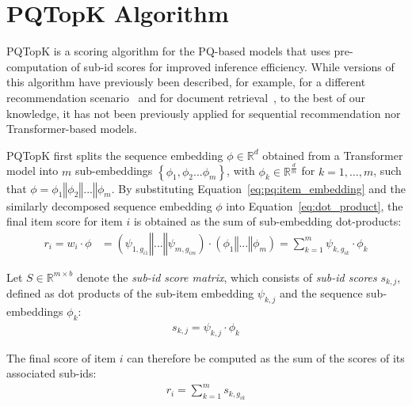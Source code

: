 \documentclass[sigconf,natbib=true, review=true]{acmart} %
\newcommand{\pageenlarge}[1]{\marginnote{#1}\enlargethispage{#1\baselineskip}}
\newcommand{\rsasha}[1]{\textcolor[HTML]{FF0000}{#1}}
\begin{document}
\pageenlarge{3}
\section{PQTopK Algorithm} \label{sec:pq_topk}
\rsasha{PQTopK is a scoring algorithm for the PQ-based models \rsasha{that uses pre-computation of sub-id scores for improved inference efficiency}. While versions of this algorithm have previously been described, for example, for a different recommendation scenario~\cite{lianLightRecMemorySearchEfficient2020} and for document retrieval~\cite{zhanJointlyOptimizingQuery2021}, to the best of our knowledge, it has not been previously applied for sequential recommendation nor Transformer-based models.}

 PQTopK first splits the sequence embedding $\phi \in \mathbb{R}^{d}$ \rsasha{obtained from a Transformer model} into $m$ sub-embeddings $\left\{\phi_1, \phi_2 ... \phi_m\right\}$, with $\phi_{k} \in \mathbb{R}^{\frac{d}{m}}$ for $k=1, \ldots,m$, such that $\phi = \phi_1  \mathbin\Vert \phi_2  \mathbin\Vert ... \mathbin\Vert  \phi_m$.
By substituting Equation~\eqref{eq:pq:item_embedding} and the similarly decomposed sequence embedding $\phi$ into Equation~\eqref{eq:dot_product}, the final item score for item $i$ is obtained as the sum of sub-embedding dot-products: 
\begin{align}
   r_i = w_i \cdot \phi &= (\psi_{1,g_{i1}} \mathbin\Vert ... \mathbin\Vert  \psi_{m,g_{im}}) \cdot (\phi_1  \mathbin\Vert ... \mathbin\Vert  \phi_m) = \sum_{k=1}^m \psi_{k,g_{ik}} \cdot \phi_k \nonumber
\end{align}

Let $S \in \mathbb{R}^{m \times b}$ denote the \emph{sub-id score matrix}, which consists of \emph{sub-id scores} $s_{k,j}$, defined as dot products of the sub-item embedding $\psi_{k,j}$ and the sequence sub-embeddings $\phi_k$:
\begin{align}
s_{k,j} = \psi_{k,j} \cdot \phi_k\label{eq:sub_item_scores}
\end{align}

The final score of item $i$ can therefore be computed as the sum of the scores of its associated sub-ids:
\begin{align}
   r_{i} = \sum_{k=1}^m s_{k,g_{ik}} \label{eq:sum_sub_scores}
\end{align}
\end{document}
